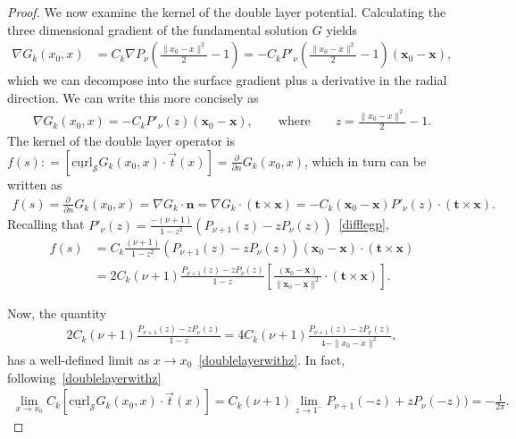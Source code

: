 \documentclass[final]{siamltex}
\newcommand{\C}{C_k}
\renewcommand{\S} {\mathcal{S}}
\begin{document}
\begin{proof}
We now examine the kernel of the double layer potential. Calculating the
three dimensional gradient of the fundamental solution $G$ yields
\begin{align*}
  \nabla G_k(x_0,x) &= \C \nabla P_\nu\left(
    \frac{\|x_0-x\|^2}{2}-1\right) = 
  -\C P'_\nu\left(\frac{\|x_0-x\|^2}{2}-1\right)
    (\mathbf{x}_{0}-\mathbf{x}),
\end{align*}
which we can decompose into the surface gradient plus a derivative in
the radial direction. We can write this more concisely as
\begin{align*}
\nabla G_k(x_0,x)=-\C P'_{\nu}(z) (\mathbf{x}_0-\mathbf{x}), \qquad \mbox{where}\qquad
  z=\frac{\|{ x_0}-{x}\|^2}{2}-1.
\end{align*} 
The kernel of the double layer operator is $f(s): =
[\underline{\mbox{curl}}_{\S}G_{k}(x_{0},x) \cdot \vec{t}(x)]=
\frac{\partial}{\partial n} G_k({x}_{0},{x})$, which in turn can be
written as 
\begin{align*}
 f(s)=\frac{\partial \, }{\partial n} G_{k}(x_{0},x) 
 =\nabla G_{k} \cdot \mathbf{n} = \nabla G_k\cdot \left( \mathbf{t}
 \times \mathbf{x} \right) 
 =-\C (\mathbf{x}_0-\mathbf{x})P'_{\nu}(z)\cdot \left(
 \mathbf{t} \times \mathbf{x} \right).
\end{align*}
Recalling that $P'_{\nu}(z)=\frac{-(\nu+1)}{1-z^2}(P_{\nu+1}(z)-z
P_{\nu}(z))$~\eqref{difflegp},
\begin{align}
  f(s) &= \C \frac{(\nu+1)}{1-z^2}\left(
  P_{\nu+1}(z)-zP_{\nu}(z)\right) 
  (\mathbf{x}_0-\mathbf{x})\cdot \left(
  \mathbf{t} \times {\mathbf x} \right) \nonumber\\
  &= 2\C(\nu+1)\frac{P_{\nu+1}(z)-zP_{\nu}(z)}{1-z} \left[
  \frac{(\mathbf{x}_0-\mathbf{x})}{\|\mathbf{x}_{0}-\mathbf{x}\|^2}
  \cdot \left( \mathbf{t} \times \mathbf{x} \right)\right].
  \label{kern1}
\end{align} 

Now, the quantity
\begin{align*}
  2\C(\nu+1)\frac{P_{\nu+1}(z)-zP_{\nu}(z)}{1-z}
  =4\C(\nu+1)\frac{P_{\nu+1}(z)-zP_{\nu}(z)}{4-\|{x_0}-{x}\|^2},
\end{align*}
has a well-defined limit as $x \rightarrow
x_{0}$~\eqref{doublelayerwithz}. In fact,
following~\eqref{doublelayerwithz}
\begin{align*}
  \lim_{x\rightarrow x_0} 
  \C[\underline{\mbox{curl}}_{\S}G_{k}(x_{0},x) \cdot \vec{t}(x)] 
  = \C(\nu+1)\lim_{z\rightarrow 1^-}
  P_{\nu+1}(-z)+zP_{\nu}(-z)) = -\frac{1}{2\pi}.
\end{align*}


\end{proof}
\end{document}
